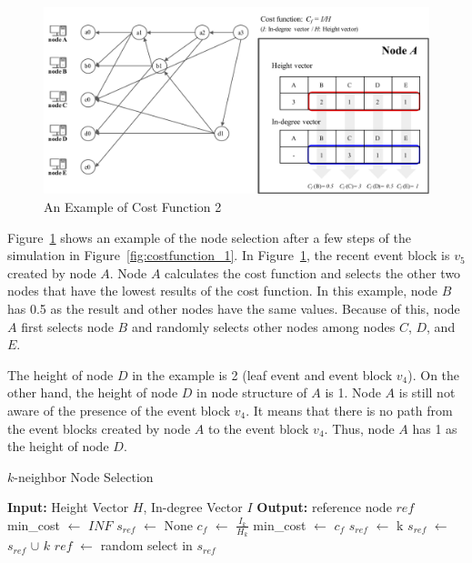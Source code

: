 \documentclass{article}
\begin{document}
\begin{figure}[H] \centering  
\includegraphics[width=.8\textwidth]{costfunction_2.pdf}
\caption{An Example of Cost Function 2}
\label{fig:costfunction_2}
\end{figure}

Figure~\ref{fig:costfunction_2} shows an example of the node selection after a few steps of the simulation in Figure~\ref{fig:costfunction_1}. In Figure~\ref{fig:costfunction_2}, the recent event block is $v_5$ created by node $A$. Node $A$ calculates the cost function and selects the other two nodes that have the lowest results of the cost function. In this example, node $B$ has 0.5 as the result and other nodes have the same values. Because of this, node $A$ first selects node $B$ and randomly selects other nodes among nodes $C$, $D$, and $E$.

The height of node $D$ in the example is 2 (leaf event and event block $v_4$). On the other hand, the height of node $D$ in node structure of $A$ is 1. Node $A$ is still not aware of the presence of the event block $v_4$. It means that there is no path from the event blocks created by node $A$ to the event block $v_4$. Thus, node $A$ has 1 as the height of node $D$. 

\begin{algorithm}[H]
\caption{$k$-neighbor Node Selection}\label{al:ns}
\begin{algorithmic}[1]
	\State \textbf{Input:} Height Vector $H$, In-degree Vector $I$
	\State \textbf{Output:} reference node $ref$
	\State min\_cost $\leftarrow$ $INF$ 
	\State $s_{ref}$ $\leftarrow$ None
	\State $c_f$ $\leftarrow$ $\frac{I_k}{H_k}$ 
	\State min\_cost $\leftarrow$ $c_f$
	\State $s_{ref}$ $\leftarrow$ {k}
	\State $s_{ref}$ $\leftarrow$ $s_{ref}$ $\cup$ $k$
	\EndIf
	\EndFor
	\State $ref$ $\leftarrow$ random select in $s_{ref}$
	\EndProcedure
\end{algorithmic}
\end{algorithm}
\end{document}
